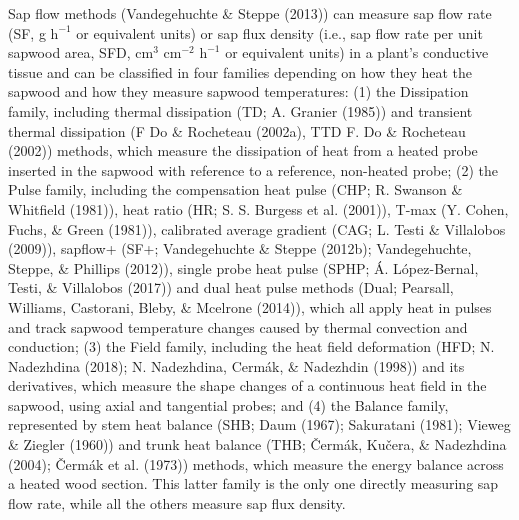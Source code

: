 \documentclass[11pt,twoside]{reedthesis}
\begin{document}
Sap flow methods (Vandegehuchte \& Steppe (2013)) can measure sap flow
rate (SF, g \(\text{h}^{-1}\) or equivalent units) or sap flux density
(i.e., sap flow rate per unit sapwood area, SFD, \(\text{cm}^3\)
\(\text{cm}^{-2}\) \(\text{h}^{-1}\) or equivalent units) in a plant's
conductive tissue and can be classified in four families depending on
how they heat the sapwood and how they measure sapwood temperatures: (1)
the Dissipation family, including thermal dissipation (TD; A. Granier
(1985)) and transient thermal dissipation (F Do \& Rocheteau (2002a),
TTD F. Do \& Rocheteau (2002)) methods, which measure the dissipation of
heat from a heated probe inserted in the sapwood with reference to a
reference, non-heated probe; (2) the Pulse family, including the
compensation heat pulse (CHP; R. Swanson \& Whitfield (1981)), heat
ratio (HR; S. S. Burgess et al. (2001)), T-max (Y. Cohen, Fuchs, \&
Green (1981)), calibrated average gradient (CAG; L. Testi \& Villalobos
(2009)), sapflow+ (SF+; Vandegehuchte \& Steppe (2012b); Vandegehuchte,
Steppe, \& Phillips (2012)), single probe heat pulse (SPHP; Á.
López-Bernal, Testi, \& Villalobos (2017)) and dual heat pulse methods
(Dual; Pearsall, Williams, Castorani, Bleby, \& Mcelrone (2014)), which
all apply heat in pulses and track sapwood temperature changes caused by
thermal convection and conduction; (3) the Field family, including the
heat field deformation (HFD; N. Nadezhdina (2018); N. Nadezhdina,
Cermák, \& Nadezhdin (1998)) and its derivatives, which measure the
shape changes of a continuous heat field in the sapwood, using axial and
tangential probes; and (4) the Balance family, represented by stem heat
balance (SHB; Daum (1967); Sakuratani (1981); Vieweg \& Ziegler (1960))
and trunk heat balance (THB; Čermák, Kučera, \& Nadezhdina (2004);
Čermák et al. (1973)) methods, which measure the energy balance across a
heated wood section. This latter family is the only one directly
measuring sap flow rate, while all the others measure sap flux
density.\par
\end{document}
